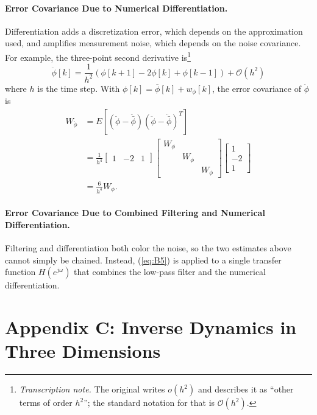 \documentclass[11pt]{article}
\newcommand{\tnote}[1]{\footnote{\textit{Transcription note.} #1}}
\begin{document}
\paragraph{Error Covariance Due to Numerical Differentiation.}
Differentiation adds a discretization error, which depends on the
approximation used, and amplifies measurement noise, which depends on the
noise covariance. For example, the three-point second derivative
is\tnote{The original writes $o(h^2)$ and describes it as ``other terms of
order $h^2$''; the standard notation for that is $\mathcal{O}(h^2)$.}
\begin{equation}
\ddot{\phi}[k] = \frac{1}{h^2}(\phi[k+1] - 2\phi[k] + \phi[k-1])
+ \mathcal{O}(h^2)
\label{eq:B6}
\end{equation}
where $h$ is the time step. With $\phi[k]=\bar{\phi}[k]+w_{\phi}[k]$, the error
covariance of $\ddot{\phi}$ is
\begin{equation}
\begin{split}
W_{\ddot{\phi}} &= E[(\ddot{\phi}-\ddot{\bar{\phi}})
(\ddot{\phi}-\ddot{\bar{\phi}})^T]\\
&= \frac{1}{h^4}\begin{bmatrix}1 & -2 & 1\end{bmatrix}
\begin{bmatrix}W_{\phi} & & \\ & W_{\phi} & \\ & & W_{\phi}\end{bmatrix}
\begin{bmatrix}1\\ -2\\ 1\end{bmatrix}\\
&= \frac{6}{h^4}W_{\phi}.
\end{split}
\label{eq:B7}
\end{equation}

\paragraph{Error Covariance Due to Combined Filtering and Numerical
Differentiation.} Filtering and differentiation both color the noise, so the
two estimates above cannot simply be chained. Instead, (\ref{eq:B5}) is
applied to a single transfer function $H(e^{j\omega})$ that combines the
low-pass filter and the numerical differentiation.

\section*{Appendix C: Inverse Dynamics in Three Dimensions}
\setcounter{equation}{0}
\renewcommand{\theequation}{C\arabic{equation}}
\end{document}
